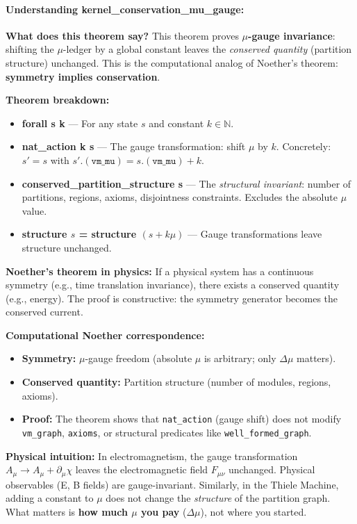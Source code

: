 \paragraph{Understanding kernel\_conservation\_mu\_gauge:}

\textbf{What does this theorem say?} This theorem proves \textbf{$\mu$-gauge invariance}: shifting the $\mu$-ledger by a global constant leaves the \textit{conserved quantity} (partition structure) unchanged. This is the computational analog of Noether's theorem: \textbf{symmetry implies conservation}.

\textbf{Theorem breakdown:}
\begin{itemize}
    \item \textbf{forall s k} — For any state $s$ and constant $k \in \mathbb{N}$.
    \item \textbf{nat\_action k s} — The gauge transformation: shift $\mu$ by $k$. Concretely: $s' = s$ with $s'.(\texttt{vm\_mu}) = s.(\texttt{vm\_mu}) + k$.
    \item \textbf{conserved\_partition\_structure s} — The \textit{structural invariant}: number of partitions, regions, axioms, disjointness constraints. Excludes the absolute $\mu$ value.
    \item \textbf{structure $s$ = structure $(s + k\mu)$} — Gauge transformations leave structure unchanged.
\end{itemize}

\textbf{Noether's theorem in physics:} If a physical system has a continuous symmetry (e.g., time translation invariance), there exists a conserved quantity (e.g., energy). The proof is constructive: the symmetry generator becomes the conserved current.

\textbf{Computational Noether correspondence:}
\begin{itemize}
    \item \textbf{Symmetry:} $\mu$-gauge freedom (absolute $\mu$ is arbitrary; only $\Delta\mu$ matters).
    \item \textbf{Conserved quantity:} Partition structure (number of modules, regions, axioms).
    \item \textbf{Proof:} The theorem shows that \texttt{nat\_action} (gauge shift) does not modify \texttt{vm\_graph}, \texttt{axioms}, or structural predicates like \texttt{well\_formed\_graph}.
\end{itemize}

\textbf{Physical intuition:} In electromagnetism, the gauge transformation $A_\mu \to A_\mu + \partial_\mu \chi$ leaves the electromagnetic field $F_{\mu\nu}$ unchanged. Physical observables (E, B fields) are gauge-invariant. Similarly, in the Thiele Machine, adding a constant to $\mu$ does not change the \textit{structure} of the partition graph. What matters is \textbf{how much $\mu$ you pay} ($\Delta\mu$), not where you started.

